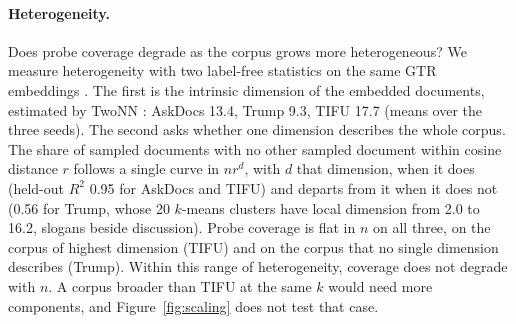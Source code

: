 
\paragraph{Heterogeneity.} Does probe coverage degrade as the corpus grows more heterogeneous? We measure heterogeneity with two label-free statistics on the same GTR embeddings \citep{li2026coverage}. The first is the intrinsic dimension of the embedded documents, estimated by TwoNN \citep{facco2017}: AskDocs 13.4, Trump 9.3, TIFU 17.7 (means over the three seeds). The second asks whether one dimension describes the whole corpus. The share of sampled documents with no other sampled document within cosine distance $r$ follows a single curve in $n r^{d}$, with $d$ that dimension, when it does (held-out $R^2$ 0.95 for AskDocs and TIFU) and departs from it when it does not (0.56 for Trump, whose 20 $k$-means clusters have local dimension from 2.0 to 16.2, slogans beside discussion). Probe coverage is flat in $n$ on all three, on the corpus of highest dimension (TIFU) and on the corpus that no single dimension describes (Trump). Within this range of heterogeneity, coverage does not degrade with $n$. A corpus broader than TIFU at the same $k$ would need more components, and Figure~\ref{fig:scaling} does not test that case.
